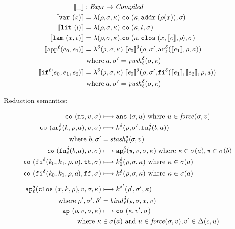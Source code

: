 \documentclass{llncs}
\begin{document}
\begin{align*}
\compile{\_} &: \Expr \to \Compiled \\
\compile{\svar\mvar} &= \lambda(\menv,\msto,\mkont) .\co{\mkont,\saddr{\menv(\mvar)},\msto}
\\
\compile{\slit\mlit} &= \lambda(\menv,\msto,\mkont) .
\co{\mkont,\mlit,\msto}
\\
\compile{\slam\mvar\mexp} &= \lambda(\menv,\msto,\mkont) .
\co{\mkont,\clos{\mvar,\compile\mexp,\menv},\msto}
\\
\compile{\sapp[^\mlab]{\mexpi0}{\mexpi1}} &= \lambda^\mcntr (\menv,\msto,\mkont) .
\compile{\mexpi0}^\mcntr(\menv,\msto',\kar[_\mlab^\mcntr]{\compile{\mexpi1},\menv,\maddr})
\\
&
\text{ where }\maddr,\msto' = \push^\mcntr_\mlab(\msto,\mkont)
\\
\compile{\sif[^\mlab]{\mexpi0}{\mexpi1}{\mexpi2}} &= \lambda^\mcntr(\menv,\msto,\mkont) .
\compile{\mexpi0}^\delta(\menv,\msto',\kif[^\mcntr]{\compile{\mexpi1},\compile{\mexpi2},\menv,\maddr})
\\
&\text{ where }\maddr,\msto' = \push_\mlab^\mcntr(\msto,\mkont)
\end{align*}

Reduction semantics:

\begin{gather*}
\begin{align*}
\co{\kmt,\mval,\msto} &\machstep
\ans{\msto,\mvalx{u}}
\text{ where } \mvalx{u} \in \force(\msto,\mval)
\\
\co{\kar[^\mcntr_\mlab]{\mcomp,\menv,\maddr},\mval,\msto} & \machstep
\mcomp^\mcntr(\menv,\msto',\kfn[^\mcntr_\mlab]{\maddralt,\maddr})
\\
\text{ where }\maddralt,\msto' &= \stash_\mlab^\mcntr(\msto,\mval)
\\
\co{\kfn[^\mcntr_\mlab]{\maddralt,\maddr},\mval,\msto} & \machstep
\ap[^\mcntr_\mlab]{\mvalx{u},\mval,\msto,\mkont}
\text{ where } \mkont \in \msto(\maddr), \mvalx{u} \in \msto(\maddralt)
\\
\co{\kif[^\mcntr]{\mcompi0,\mcompi1,\menv,\maddr},\strue,\msto} & \machstep
\mcompi0^\mcntr(\menv,\msto,\mkont)
\text{ where }\mkont\in\msto(\maddr)
\\
\co{\kif[^\mcntr]{\mcompi0,\mcompi1,\menv,\maddr},\sfalse,\msto} & \machstep
\mcompi1^\mcntr(\menv,\msto,\mkont)
\text{ where }\mkont\in\msto(\maddr)
\\[2mm]
\ap[^\mcntr_\mlab]{\clos{\mvar,\mcomp,\menv},\mval,\msto,\mkont} & \machstep
\mcomp^{\mcntr'}(\menv',\msto',\mkont) \\
\text{ where }\menv',\msto',\mcntr' &= \bind^\mcntr_\mlab(\menv,\msto,\mvar,\mval)
\\
\ap{\mop,\mval,\msto,\mkont} & \machstep
\co{\mkont,\mval',\msto} \\
\text{ where }\mkont &\in\msto(\maddr)
\text{ and } \mvalx{u} \in \force(\msto,\mval), \mval'\in\interpdelta(\mop,\mvalx{u})
\end{align*}
\end{gather*}
\end{document}
